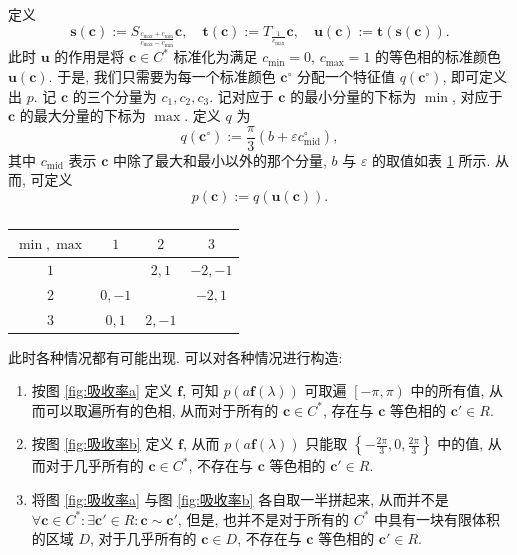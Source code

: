 \documentclass{article}
\begin{document}
定义
\begin{equation}
	\mathbf s\!\left(\mathbf c\right):=
	S_\frac{c_{\max}+c_{\min}}{c_{\max}-c_{\min}}\mathbf c,
	\quad\mathbf t\!\left(\mathbf c\right):=
	T_\frac1{c_{\max}}\mathbf c,
	\quad\mathbf u\!\left(\mathbf c\right):=\mathbf t\!\left(\mathbf s\!\left(\mathbf c\right)\right).
	\label{eq:标准化}
\end{equation}
此时 $\mathbf u$ 的作用是将 $\mathbf c\in C^*$ 标准化为满足
$c_{\min}=0$, $c_{\max}=1$ 的等色相的标准颜色
$\mathbf u\!\left(\mathbf c\right)$.
于是, 我们只需要为每一个标准颜色 $\mathbf c^\circ$
分配一个特征值 $q\!\left(\mathbf c^\circ\right)$, 即可定义出 $p$.
记 $\mathbf c$ 的三个分量为 $c_1,c_2,c_3$.
记对应于 $\mathbf c$ 的最小分量的下标为 $\min$,
对应于 $\mathbf c$ 的最大分量的下标为 $\max$.
定义 $q$ 为
\begin{equation}
	q\!\left(\mathbf c^\circ\right):=\frac\pi3\left(b+\varepsilon c^\circ_\mathrm{mid}\right),
\end{equation}
其中 $c_\mathrm{mid}$ 表示 $\mathbf c$ 中除了最大和最小以外的那个分量,
$b$ 与 $\varepsilon$ 的取值如表 \ref{tab:be} 所示.
从而, 可定义
\begin{equation}
	p\!\left(\mathbf c\right):=
	q\!\left(\mathbf u\!\left(\mathbf c\right)\right).
\end{equation}

\begin{table}[h!]
	\centering
	\begin{tabular}{c|ccc}
		$\min,\max$&$1$&$2$&$3$\\
		\hline
		$1$&&$2,1$&$-2,-1$\\
		$2$&$0,-1$&&$-2,1$\\
		$3$&$0,1$&$2,-1$&
	\end{tabular}
	\caption{}
	\label{tab:be}
\end{table}

此时各种情况都有可能出现.
可以对各种情况进行构造:
\begin{enumerate}
	\item
	按图 \ref{fig:吸收率a} 定义 $\mathbf f$,
	可知 $p\!\left(a\mathbf f\!\left(\lambda\right)\right)$
	可取遍 $\left[-\pi,\pi\right)$ 中的所有值,
	从而可以取遍所有的色相,
	从而对于所有的 $\mathbf c\in C^*$,
	存在与 $\mathbf c$ 等色相的 $\mathbf c'\in R$.

	\item
	按图 \ref{fig:吸收率b} 定义 $\mathbf f$,
	从而 $p\!\left(a\mathbf f\!\left(\lambda\right)\right)$
	只能取 $\left\{-\frac{2\pi}3,0,\frac{2\pi}3\right\}$ 中的值,
	从而对于几乎所有的 $\mathbf c\in C^*$,
	不存在与 $\mathbf c$ 等色相的 $\mathbf c'\in R$.

	\item
	将图 \ref{fig:吸收率a} 与图 \ref{fig:吸收率b} 各自取一半拼起来,
	从而并不是 $\forall\mathbf c\in C^*:\exists\mathbf c'\in R:\mathbf c\sim\mathbf c'$,
	但是, 也并不是对于所有的 $C^*$ 中具有一块有限体积的区域 $D$,
	对于几乎所有的 $\mathbf c\in D$,
	不存在与 $\mathbf c$ 等色相的 $\mathbf c'\in R$.
\end{enumerate}
\end{document}

